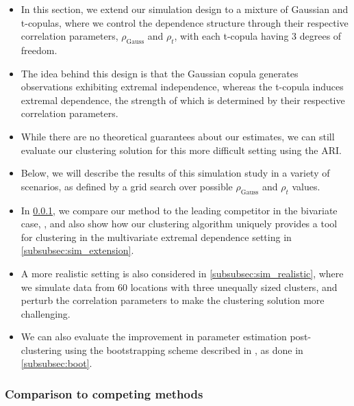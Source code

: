 \documentclass{article}
\numberwithin{equation}{section}
\begin{document}
\begin{itemize}
  \item In this section, we extend our simulation design to a mixture of Gaussian and t-copulas, where we control the dependence structure through their respective correlation parameters, $\rho_{\text{Gauss}}$ and $\rho_{t}$, with each t-copula having 3 degrees of freedom.
  \item The idea behind this design is that the Gaussian copula generates observations exhibiting extremal independence, whereas the t-copula induces extremal dependence, the strength of which is determined by their respective correlation parameters.
  \item While there are no theoretical guarantees about our estimates, we can still evaluate our clustering solution for this more difficult setting using the ARI.
  \item Below, we will describe the results of this simulation study in a variety of scenarios, as defined by a grid search over possible $\rho_{\text{Gauss}}$ and $\rho_{t}$ values. 
  \item In \ref{subsubsec:sim_competing_methods}, we compare our method to the leading competitor in the bivariate case, \cite{Vignotto2021}, and also show how our clustering algorithm uniquely provides a tool for clustering in the multivariate extremal dependence setting in \ref{subsubsec:sim_extension}.
  \item A more realistic setting is also considered in \ref{subsubsec:sim_realistic}, where we simulate data from 60 locations with three unequally sized clusters, and perturb the correlation parameters to make the clustering solution more challenging.
  \item We can also evaluate the improvement in parameter estimation post-clustering using the bootstrapping scheme described in \cite{Heffernan2004}, as done in \ref{subsubsec:boot}.
\end{itemize}

\subsubsection{Comparison to competing methods} \label{subsubsec:sim_competing_methods}
\end{document}

